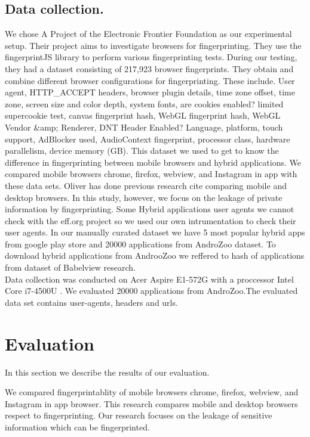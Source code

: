 \subsection{Data collection.}
We chose A Project of the Electronic Frontier Foundation as our experimental setup. Their project aims to investigate browsers for fingerprinting. They use the fingerprintJS library to perform various fingerprinting tests. During our testing, they had a dataset consisting of 217,923 browser fingerprints. They obtain and combine different browser configurations for fingerprinting. These include. 
    User agent, HTTP\_ACCEPT headers, browser plugin details, time zone offset, time zone, screen size and color depth, system fonts, are cookies enabled? limited supercookie test, canvas fingerprint hash, WebGL fingerprint hash, WebGL Vendor &amp; Renderer, DNT Header Enabled?
Language, platform, touch support, AdBlocker used, AudioContext fingerprint, processor class, hardware parallelism, device memory (GB).
This dataset we used to get to know the difference in fingerprinting between mobile browsers and hybrid applications. We compared mobile browsers chrome, firefox, webview, and Instagram in app with these data sets. Oliver has done previous research cite comparing mobile and desktop browsers. In this study, however, we focus on the leakage of private information by fingerprinting. 
Some Hybrid applications user agents we cannot check with the eff.org project so we used our own intrumentation to check their user agents.
In our manually curated dataset we have 5 most popular hybrid apps from google play store and 20000 applications from AndroZoo dataset\cite{allix2016androzoo}. To download hybrid applications from AndrooZoo we reffered to hash of applications from dataset of Babelview  research\cite{rizzo2018babelview}.\\
Data collection was conducted on Acer Aspire E1-572G with a proccessor Intel Core i7-4500U . We evaluated 20000 applications from AndroZoo.The evaluated data set contains user-agents, headers and urls.

\section{Evaluation}
In this section we describe the results of our evaluation.

We compared fingerprintablity of mobile browsers chrome, firefox, webview, and Instagram in app browser. This\cite{oliver2018fingerprinting}  research  compares mobile and desktop browsers respect to fingerprinting. Our research focuses on the leakage of sensitive information which can be fingerprinted. 

